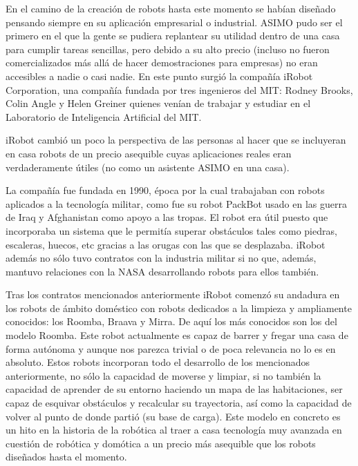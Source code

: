 En el camino de la creación de robots hasta este momento se habían diseñado pensando siempre en su aplicación empresarial o industrial. ASIMO pudo ser el primero en el que la gente se pudiera replantear su utilidad dentro de una casa para cumplir tareas sencillas, pero debido a su alto precio (incluso no fueron comercializados más allá de hacer demostraciones para empresas) no eran accesibles a nadie o casi nadie. En este punto surgió la compañía iRobot Corporation, una compañía fundada por tres ingenieros del MIT: Rodney Brooks, Colin Angle y Helen Greiner quienes venían de trabajar y estudiar en el Laboratorio de Inteligencia Artificial del MIT.

\vspace{10px}

iRobot cambió un poco la perspectiva de las personas al hacer que se incluyeran en casa robots de un precio asequible cuyas aplicaciones reales eran verdaderamente útiles (no como un asistente ASIMO en una casa).

\vspace{10px}

La compañía fue fundada en 1990, época por la cual trabajaban con robots aplicados a la tecnología militar, como fue su robot PackBot usado en las guerra de Iraq y Afghanistan como apoyo a las tropas. El robot era útil puesto que incorporaba un sistema que le permitía superar obstáculos tales como piedras, escaleras, huecos, etc gracias a las orugas con las que se desplazaba. iRobot además no sólo tuvo contratos con la industria militar si no que, además, mantuvo relaciones con la NASA desarrollando robots para ellos también.

\vspace{10px}

Tras los contratos mencionados anteriormente iRobot comenzó su andadura en los robots de ámbito doméstico con robots dedicados a la limpieza y ampliamente conocidos: los Roomba, Braava y Mirra. De aquí los más conocidos son los del modelo Roomba. Este robot actualmente es capaz de barrer y fregar una casa de forma autónoma y aunque nos parezca trivial o de poca relevancia no lo es en absoluto. Estos robots incorporan todo el desarrollo de los mencionados anteriormente, no sólo la capacidad de moverse y limpiar, si no también la capacidad de aprender de su entorno haciendo un mapa de las habitaciones, ser capaz de esquivar obstáculos y recalcular su trayectoria, así como la capacidad de volver al punto de donde partió (su base de carga). Este modelo en concreto es un hito en la historia de la robótica al traer a casa tecnología muy avanzada en cuestión de robótica y domótica a un precio más asequible que los robots diseñados hasta el momento.

